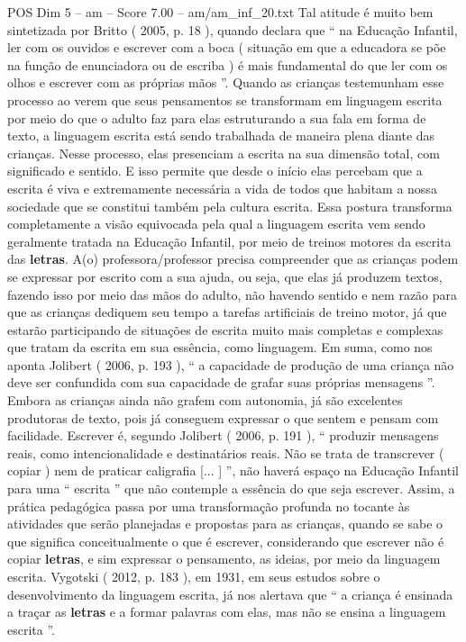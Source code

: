 \begin{textsample}{POS Dim 5 – am – Score 7.00 – am/am\_inf\_20.txt}
Tal atitude é muito bem sintetizada por Britto ( 2005, p. 18 ), quando declara que “ na Educação Infantil, ler com os ouvidos e escrever com a boca ( situação em que a educadora se põe na função de enunciadora ou de escriba ) é mais fundamental do que ler com os olhos e escrever com as próprias mãos ”.
Quando as crianças testemunham esse processo ao verem que seus pensamentos se transformam em linguagem escrita por meio do que o adulto faz para elas estruturando a sua fala em forma de texto, a linguagem escrita está sendo trabalhada de maneira plena diante das crianças.
Nesse processo, elas presenciam a escrita na sua dimensão total, com significado e sentido.
E isso permite que desde o início elas percebam que a escrita é viva e extremamente necessária a vida de todos que habitam a nossa sociedade que se constitui também pela cultura escrita.
Essa postura transforma completamente a visão equivocada pela qual a linguagem escrita vem sendo geralmente tratada na Educação Infantil, por meio de treinos motores da escrita das \textbf{letras}.
A(o) professora/professor precisa compreender que as crianças podem se expressar por escrito com a sua ajuda, ou seja, que elas já produzem textos, fazendo isso por meio das mãos do adulto, não havendo sentido e nem razão para que as crianças dediquem seu tempo a tarefas artificiais de treino motor, já que estarão participando de situações de escrita muito mais completas e complexas que tratam da escrita em sua essência, como linguagem.
Em suma, como nos aponta Jolibert ( 2006, p. 193 ), “ a capacidade de produção de uma criança não deve ser confundida com sua capacidade de grafar suas próprias mensagens ”.
Embora as crianças ainda não grafem com autonomia, já são excelentes produtoras de texto, pois já conseguem expressar o que sentem e pensam com facilidade.
Escrever é, segundo Jolibert ( 2006, p. 191 ), “ produzir mensagens reais, como intencionalidade e destinatários reais.
Não se trata de transcrever ( copiar ) nem de praticar caligrafia [... ] ”, não haverá espaço na Educação Infantil para uma “ escrita ” que não contemple a essência do que seja escrever.
Assim, a prática pedagógica passa por uma transformação profunda no tocante às atividades que serão planejadas e propostas para as crianças, quando se sabe o que significa conceitualmente o que é escrever, considerando que escrever não é copiar \textbf{letras}, e sim expressar o pensamento, as ideias, por meio da linguagem escrita.
Vygotski ( 2012, p. 183 ), em 1931, em seus estudos sobre o desenvolvimento da linguagem escrita, já nos alertava que “ a criança é ensinada a traçar as \textbf{letras} e a formar palavras com elas, mas não se ensina a linguagem escrita ”.

\end{textsample}
